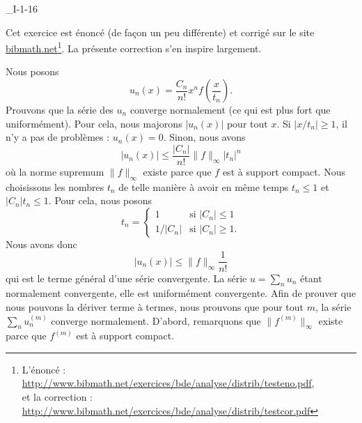 

\begin{corrige}{_I-1-16}

Cet exercice est énoncé (de façon un peu différente) et corrigé sur le site \href{http://www.bibmath.net}{bibmath.net}\footnote{L'énoncé : \href{http://www.bibmath.net/exercices/bde/analyse/distrib/testeno.pdf}{http://www.bibmath.net/exercices/bde/analyse/distrib/testeno.pdf},\\ et la correction : \href{http://www.bibmath.net/exercices/bde/analyse/distrib/testcor.pdf}{http://www.bibmath.net/exercices/bde/analyse/distrib/testcor.pdf}}. La présente correction s'en inspire largement.

Nous posons
\begin{equation}
	u_n(x)=\frac{ C_n }{ n! }x^nf(\frac{ x }{ t_n }).
\end{equation}
Prouvons que la série des $u_n$ converge normalement (ce qui est plus fort que uniformément). Pour cela, nous majorons $| u_n(x) |$ pour tout $x$. Si $| x/t_n |\geq 1$, il n'y a pas de problèmes : $u_n(x)=0$. Sinon, nous avons
\begin{equation}		\label{EqMajorationBorel16}
	| u_n(x) |\leq\frac{ | C_n | }{ n! }\| f \|_{\infty}| t_n |^n
\end{equation}
où la norme supremum $\| f \|_{\infty}$ existe parce que $f$ est à support compact. Nous choisissons les nombres $t_n$ de telle manière à avoir en même temps $t_n\leq 1$ et $| C_n |t_n\leq 1$. Pour cela, nous posons
\begin{equation}
	t_n=\begin{cases}
	1	&	\text{si $|C_n|\leq 1$}\\
	1/|C_n|	&	 \text{si $| C_n |\geq 1$.}
\end{cases}
\end{equation}
Nous avons donc
\begin{equation}
	| u_n(x) |\leq \| f \|_{\infty}\frac{1}{ n! }
\end{equation}
qui est le terme général d'une série convergente. La série $u=\sum_n u_n$ étant normalement convergente, elle est uniformément convergente. Afin de prouver que nous pouvons la dériver terme à termes, nous prouvons que pour tout $m$, la série $\sum_n u_n^{(m)}$ converge normalement. D'abord, remarquons que $\| f^{(m)} \|_{\infty}$ existe parce que $f^{(m)}$ est à support compact.


\end{corrige}
